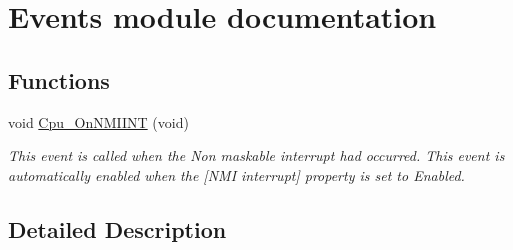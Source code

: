\hypertarget{group___events__module}{}\section{Events module documentation}
\label{group___events__module}
\subsection*{Functions}
\begin{DoxyCompactItemize}
\item 
\mbox{\label{group___events__module_ga960d094664356278ac5472d45a6ea2f3}} 
void \hyperlink{group___events__module_ga960d094664356278ac5472d45a6ea2f3}{Cpu\+\_\+\+On\+N\+M\+I\+I\+NT} (void)
\begin{DoxyCompactList}\small\item\em This event is called when the Non maskable interrupt had occurred. This event is automatically enabled when the \mbox{[}N\+MI interrupt\mbox{]} property is set to \textquotesingle{}Enabled\textquotesingle{}. \end{DoxyCompactList}\end{DoxyCompactItemize}


\subsection{Detailed Description}
